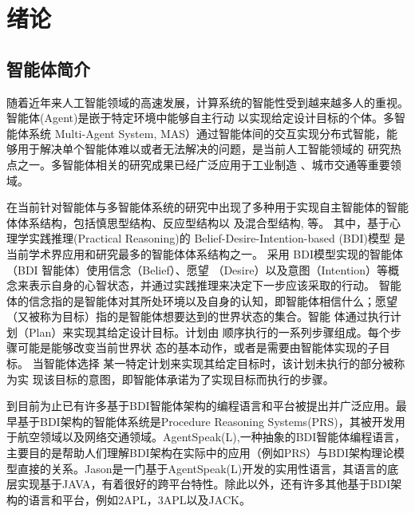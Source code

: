 \chapter{绪论}
\section{智能体简介}
随着近年来人工智能领域的高速发展，计算系统的智能性受到越来越多人的重视。智能体(Agent)是嵌于特定环境中能够自主行动 以实现给定设计目标的个体\cite{DBLP:books/daglib/0023784}。多智能体系统 Multi-Agent System, MAS）\cite{DBLP:books/daglib/0023784}通过智能体间的交互实现分布式智能，能够用于解决单个智能体难以或者无法解决的问题，是当前人工智能领域的 研究热点之一。多智能体相关的研究成果已经广泛应用于工业制造\cite{biernatzki2004agent} 、城市交通等重要领域\cite{DBLP:journals/tits/ChenC10}。

在当前针对智能体与多智能体系统的研究中出现了多种用于实现自主智能体的智能体体系结构，包括慎思型结构、反应型结构以 及混合型结构\cite{DBLP:conf/atal/2000}, \cite{DBLP:journals/ker/WooldridgeJ95}等。
其中，基于心理学实践推理(Practical Reasoning)\cite{bratman1987intention}的 Belief-Desire-Intention-based (BDI)模型\cite{DBLP:conf/atal/GeorgeffPPTW98} 是当前学术界应用和研究最多的智能体体系结构之一。
%
采用 BDI模型实现的智能体（BDI 智能体）使用信念（Belief）、愿望 （Desire）以及意图（Intention）等概念来表示自身的心智状态，并通过实践推理来决定下一步应该采取的行动。
%
智能体的信念指的是智能体对其所处环境以及自身的认知，即智能体相信什么；愿望（又被称为目标）指的是智能体想要达到的世界状态的集合。智能 体通过执行计划（Plan）来实现其给定设计目标。计划由 顺序执行的一系列步骤组成。每个步骤可能是能够改变当前世界状 态的基本动作，或者是需要由智能体实现的子目标。
%
当智能体选择 某一特定计划来实现其给定目标时，该计划未执行的部分被称为实 现该目标的意图，即智能体承诺为了实现目标而执行的步骤。

到目前为止已有许多基于BDI智能体架构的编程语言和平台被提出并广泛应用。最早基于BDI架构的智能体系统是Procedure Reasoning Systems(PRS)，其被开发用于航空领域\cite{DBLP:conf/aaai/GeorgeffL87}以及网络交通领域\cite{DBLP:conf/aaaiss/Wobcke07}。AgentSpeak(L)\cite{DBLP:conf/maamaw/Rao96},一种抽象的BDI智能体编程语言，主要目的是帮助人们理解BDI架构在实际中的应用（例如PRS）与BDI架构理论模型直接的关系。Jason\cite{bordini2007programming}是一门基于AgentSpeak(L)开发的实用性语言，其语言的底层实现基于JAVA，有着很好的跨平台特性。除此以外，还有许多其他基于BDI架构的语言和平台，例如2APL\cite{DBLP:journals/aamas/Dastani08}，3APL\cite{DBLP:books/sp/map2005/DastaniRM05}以及JACK\cite{DBLP:books/sp/map2005/Winikoff05}。

